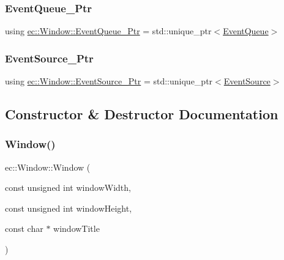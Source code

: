 \subsubsection{\texorpdfstring{Event\+Queue\+\_\+\+Ptr}{EventQueue\_Ptr}}
{\footnotesize\ttfamily using \mbox{\hyperlink{classec_1_1_window_afe0927efdedc84c345120ae15bf6994a}{ec\+::\+Window\+::\+Event\+Queue\+\_\+\+Ptr}} =  std\+::unique\+\_\+ptr$<$\mbox{\hyperlink{classec_1_1_event_queue}{Event\+Queue}}$>$}

\mbox{\label{classec_1_1_window_ae7501526590ece55dbe92ea496e62738}} 
\subsubsection{\texorpdfstring{Event\+Source\+\_\+\+Ptr}{EventSource\_Ptr}}
{\footnotesize\ttfamily using \mbox{\hyperlink{classec_1_1_window_ae7501526590ece55dbe92ea496e62738}{ec\+::\+Window\+::\+Event\+Source\+\_\+\+Ptr}} =  std\+::unique\+\_\+ptr$<$\mbox{\hyperlink{classec_1_1_event_source}{Event\+Source}}$>$}



\subsection{Constructor \& Destructor Documentation}
\mbox{\label{classec_1_1_window_af9eab51c6ea017a296866278bbbcdb28}} 
\subsubsection{\texorpdfstring{Window()}{Window()}}
{\footnotesize\ttfamily ec\+::\+Window\+::\+Window (\begin{DoxyParamCaption}\item[{const unsigned int}]{window\+Width,  }\item[{const unsigned int}]{window\+Height,  }\item[{const char $\ast$}]{window\+Title }\end{DoxyParamCaption})\hspace{0.3cm}{\ttfamily [explicit]}}

